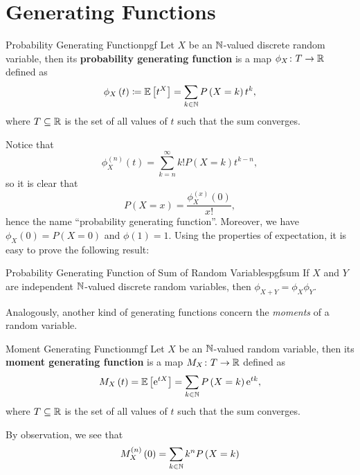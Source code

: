 \documentclass[math, code]{amznotes}
\theoremstyle{remark}
\newcommand{\e}{\mathrm{e}}
\begin{document}
\section{Generating Functions}
\begin{dfnbox}{Probability Generating Function}{pgf}
    Let $X$ be an $\mathbb{N}$-valued discrete random variable, then its {\color{red} \textbf{probability generating function}} is a map $\phi_X \colon T \to \mathbb{R}$ defined as 
    \begin{equation*}
        \phi_X\left(t\right) \coloneqq \mathbb{E}\left[t^X\right] = \sum_{k \in \mathbb{N}}P\left(X = k\right)t^k,
    \end{equation*}
    where $T \subseteq \mathbb{R}$ is the set of all values of $t$ such that the sum converges.
\end{dfnbox}
Notice that
\begin{equation*}
    \phi_X^{(n)}\left(t\right) = \sum_{k = n}^{\infty}k!P\left(X = k\right)t^{k - n},
\end{equation*}
so it is clear that 
\begin{equation*}
    P\left(X = x\right) = \frac{\phi_X^{(x)}\left(0\right)}{x!},
\end{equation*}
hence the name ``probability generating function''. Moreover, we have $\phi_X\left(0\right) = P\left(X = 0\right)$ and $\phi\left(1\right) = 1$. Using the properties of expectation, it is easy to prove the following result:
\begin{probox}{\small Probability Generating Function of Sum of Random Variables}{pgfsum}
    If $X$ and $Y$ are independent $\mathbb{N}$-valued discrete random variables, then $\phi_{X + Y} = \phi_X\phi_Y$.
\end{probox}
Analogously, another kind of generating functions concern the \textit{moments} of a random variable.
\begin{dfnbox}{Moment Generating Function}{mgf}
    Let $X$ be an $\mathbb{N}$-valued random variable, then its {\color{red} \textbf{moment generating function}} is a map $M_X \colon T \to \mathbb{R}$ defined as 
    \begin{equation*}
        M_X\left(t\right) = \mathbb{E}\left[\e^{tX}\right] = \sum_{k \in \N}P\left(X = k\right)\e^{tk},
    \end{equation*}
    where $T \subseteq \mathbb{R}$ is the set of all values of $t$ such that the sum converges.
\end{dfnbox}
By observation, we see that 
\begin{equation*}
    M_X^{(n)}\left(0\right) = \sum_{k \in \mathbb{N}}k^nP\left(X = k\right)
\end{equation*}
\end{document}
